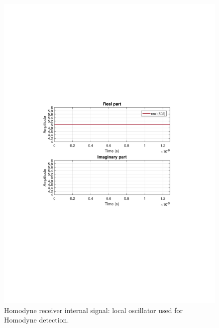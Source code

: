 \documentclass[a4paper]{article}
\begin{document}
\begin{figure}[H]
\centering
\includegraphics[width=\linewidth, trim= 0mm 95mm 0mm 95mm, clip]{localosc.pdf}
\caption{Homodyne receiver internal signal: local oscillator used for Homodyne detection.}
\label{fig:local}
\end{figure}
\end{document}
